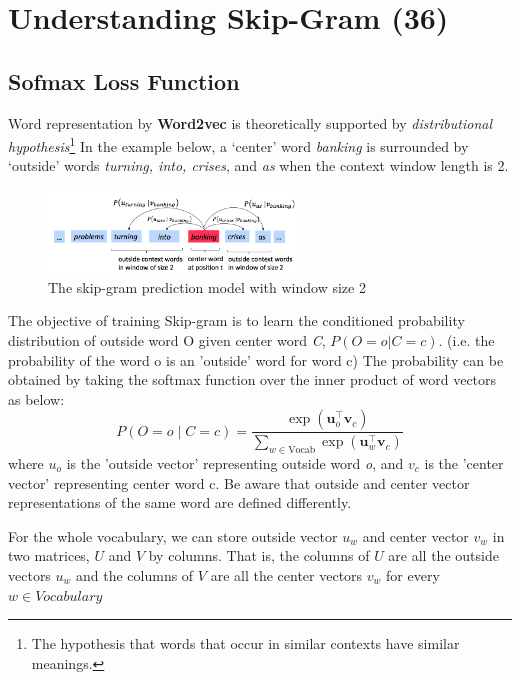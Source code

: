 \documentclass{assignment format}
\begin{document}
\section{Understanding Skip-Gram (36)}

\subsection{Sofmax Loss Function}
Word representation by \textbf{Word2vec} is theoretically supported by  \textit{distributional hypothesis}\footnote{The hypothesis that words that occur in similar contexts have similar meanings.} In the example below, a `center' word \textit{banking} is surrounded by `outside' words \textit{turning, into, crises}, and \textit{as} when the context window length is 2.

\begin{figure}[h]
    \centering
    \includegraphics[width=0.6\textwidth]{word2vec.png}
    \caption{The skip-gram prediction model with window size 2}
    \label{fig:word2vec}
\end{figure}
The objective of training Skip-gram is to learn the conditioned probability distribution of outside word {O} given center word \textit{C}, $P(O=o|C=c)$. (i.e. the probability of the word o is an 'outside' word for word c)
The probability can be obtained by taking the softmax function over the inner product of word vectors as below:
\begin{equation}
 P(O=o \mid C=c) = \frac{\exp(\bm u_{o}^\top \bm v_c)}{\sum_{w \in \text{Vocab}} \exp(\bm u_{w}^\top \bm v_c)}
 \label{word2vec_condprob}
\end{equation}
where $u_o$ is the 'outside vector' representing outside word \textit{o}, and $v_c$ is the 'center vector' representing center word c. Be aware that outside and center vector representations of the same word are defined differently.

For the whole vocabulary, we can store outside vector $u_w$ and center vector $v_w$ in two matrices, $U$ and $V$ by columns. That is, the columns of $U$ are all the outside vectors $u_w$ and the columns of $V$ are all the center vectors $v_w$ for every $w \in Vocabulary$


\end{document}
